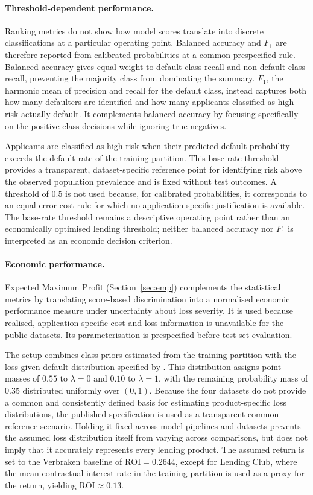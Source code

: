 \paragraph{Threshold-dependent performance.}
Ranking metrics do not show how model scores translate into discrete
classifications at a particular operating point. Balanced accuracy and $F_1$ are
therefore reported from calibrated probabilities at a common prespecified rule.
Balanced accuracy gives equal weight to default-class recall and
non-default-class recall, preventing the majority class from dominating the
summary. $F_1$, the harmonic mean of precision and recall for the default class,
instead captures both how many defaulters are identified and how many applicants
classified as high risk actually default. It complements balanced accuracy by
focusing specifically on the positive-class decisions while ignoring true
negatives.

Applicants are classified as high risk when their predicted default probability
exceeds the default rate of the training partition. This base-rate threshold
provides a transparent, dataset-specific reference point for identifying risk
above the observed population prevalence and is fixed without test outcomes. A
threshold of $0.5$ is not used because, for calibrated probabilities, it
corresponds to an equal-error-cost rule for which no application-specific
justification is available. The base-rate threshold remains a descriptive
operating point rather than an economically optimised lending threshold; neither
balanced accuracy nor $F_1$ is interpreted as an economic decision criterion.

\paragraph{Economic performance.}
Expected Maximum Profit (Section~\ref{sec:emp}) complements the
statistical metrics by translating score-based discrimination into a normalised
economic performance measure under uncertainty about loss severity. It is used
because realised, application-specific cost and loss information is unavailable
for the public datasets. Its parameterisation is prespecified before test-set
evaluation.

The setup combines class priors estimated from the training partition with the
loss-given-default distribution specified by
\citet{verbrakenDevelopmentApplicationConsumer2014}. This distribution assigns
point masses of $0.55$ to $\lambda=0$ and $0.10$ to $\lambda=1$, with the
remaining probability mass of $0.35$ distributed uniformly over $(0,1)$. Because
the four datasets do not provide a common and consistently defined basis for
estimating product-specific loss distributions, the published specification is
used as a transparent common reference scenario. Holding it fixed across model
pipelines and datasets prevents the assumed loss distribution itself from varying
across comparisons, but does not imply that it accurately represents every
lending product. The assumed return is set to the Verbraken baseline of
$\mathrm{ROI}=0.2644$, except for Lending Club, where the mean contractual
interest rate in the training partition is used as a proxy for the return,
yielding $\mathrm{ROI}\approx0.13$.



